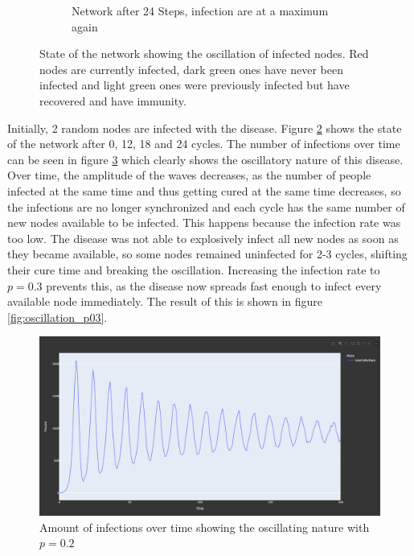 \begin{figure}
\begin{subfigure}[b]{0.475\textwidth}
        \caption[]%
        {{\small Network after 24 Steps, infection are at a maximum again}}    
        \label{fig:mean and std of net44}
    \end{subfigure}
    \caption[ State of the network showing the oscillation of infected nodes ]
    {\small State of the network showing the oscillation of infected nodes. Red nodes are currently infected, dark green ones have never been infected and 
    light green ones were previously infected but have recovered and have immunity.} 
    \label{fig:osc_network}
\end{figure}
\clearpage

Initially, 2 random nodes are infected with the disease. Figure \ref{fig:osc_network}
shows the state of the network after 0, 12, 18 and 24 cycles.
The number of infections over time can be seen in figure \ref{fig:oscillation_p02}
which clearly shows the oscillatory nature of this disease. Over time, the amplitude of the
waves decreases, as the number of people infected at the same time and thus getting cured
at the same time decreases, so the infections are no longer synchronized and each cycle has the same number of new nodes available to be infected. This happens because the
infection rate was too low. The disease was not able to explosively infect all new nodes
as soon as they became available, so some nodes remained uninfected for 2-3 cycles,
shifting their cure time and breaking the oscillation. Increasing the infection rate
to $p = 0.3$ prevents this, as the disease now spreads fast enough to infect every
available node immediately. The result of this is shown in figure \ref{fig:oscillation_p03}.

\begin{figure}[!ht]
    \centering
    \includegraphics[width=0.75\linewidth]{images/oscillation_infections.png}
    \caption{Amount of infections over time showing the oscillating nature with $p = 0.2$}
    \label{fig:oscillation_p02}
\end{figure}

